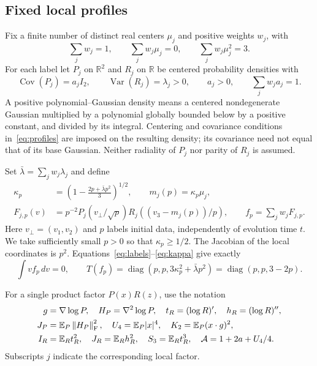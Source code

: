 \documentclass[11pt]{article}
\numberwithin{equation}{section}
\newcommand{\R}{\mathbb R}
\newcommand{\E}{\mathbb E}
\newcommand{\diag}{\operatorname{diag}}
\newcommand{\normF}[1]{\left\|#1\right\|_{\mathrm F}}
\begin{document}
\subsection{Fixed local profiles}
Fix a finite number of distinct real centers \(\mu_j\) and positive
weights \(w_j\), with
\begin{equation}\label{eq:labels}
 \sum_jw_j=1,\qquad\sum_jw_j\mu_j=0,\qquad
 \sum_jw_j\mu_j^2=3.
\end{equation}
For each label let \(P_j\) on \(\R^2\) and \(R_j\) on \(\R\) be
centered probability densities with
\begin{equation}\label{eq:profiles}
 \operatorname{Cov}(P_j)=a_jI_2,\qquad
 \operatorname{Var}(R_j)=\lambda_j>0,\qquad
 a_j>0,\qquad\sum_jw_ja_j=1.
\end{equation}
A positive polynomial--Gaussian density means a centered nondegenerate
Gaussian multiplied by a polynomial globally bounded below by a positive
constant, and divided by its integral. Centering and covariance
conditions in~\eqref{eq:profiles} are imposed on the resulting density;
its covariance need not equal that of its base Gaussian. Neither
radiality of \(P_j\) nor parity of \(R_j\) is assumed.

Set \(\bar\lambda=\sum_jw_j\lambda_j\) and define
\begin{align}
 \kappa_p&=\left(1-\frac{2p+\bar\lambda p^2}{3}\right)^{1/2},
 \qquad m_j(p)=\kappa_p\mu_j,\label{eq:kappa}\\
 F_{j,p}(v)&=p^{-2}P_j(v_\perp/\sqrt p)
                  R_j((v_3-m_j(p))/p),\qquad
 f_p=\sum_jw_jF_{j,p}.\label{eq:beam}
\end{align}
Here \(v_\perp=(v_1,v_2)\) and \(p\) labels initial data, independently
of evolution time \(t\). We take sufficiently small \(p>0\) so that
\(\kappa_p\geq1/2\). The Jacobian of the local coordinates is \(p^2\).
Equations~\eqref{eq:labels}--\eqref{eq:kappa} give exactly
\begin{equation}\label{eq:Tbeam}
 \int vf_p\,dv=0,\qquad
 T(f_p)=\diag(p,p,3\kappa_p^2+\bar\lambda p^2)
       =\diag(p,p,3-2p).
\end{equation}

For a single product factor \(P(x)R(z)\), use the notation
\begin{align}
 g&=\nabla\log P,\quad H_P=\nabla^2\log P,\quad
 t_R=(\log R)',\quad h_R=(\log R)'',\notag\\
 J_P&=\E_P\normF{H_P}^2,\quad
 U_4=\E_P|x|^4,\quad K_2=\E_P(x\cdot g)^2,\label{eq:transmom}\\
 I_R&=\E_Rt_R^2,\quad J_R=\E_Rh_R^2,\quad
 S_3=\E_Rt_R^3,\quad \mathcal A=1+2a+U_4/4.
 \label{eq:longmom}
\end{align}
Subscripts \(j\) indicate the corresponding local factor.
\end{document}
